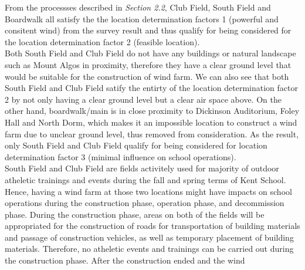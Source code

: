 \documentclass[review]{elsarticle}
\begin{document}
\label{graph:locationpick}

From the processses described in \textit{Section 2.2}, Club Field, South Field and Boardwalk all satisfy the the location determination factors 1 (powerful and consitent wind) 
from the survey result and thus qualify for being considered for the location determination factor 2 (feasible location).  %
\\\indent Both South Field and Club Field do not have any buildings or natural landscape such as Mount Algos in proximity, therefore they have a clear ground level that would 
be suitable for the construction of wind farm. We can also see that both South Field and Club Field satify the entirty of the location determination factor 2 by not only having 
a clear ground level but a clear air space above. On the other hand, boardwalk/main is in close proximity to Dickinson Auditorium, Foley Hall and North Dorm, which makes it an 
impossible location to construct a wind farm due to unclear ground level, thus removed from consideration. As the result, only South Field and Club Field qualify for being 
considered for location determination factor 3 (minimal influence on school operations).
\\\indent South Field and Club Field are fields activitely used for majority of outdoor atheletic trainings and events during the fall and spring terms of Kent School. Hence, 
having a wind farm at those two locations might have impacts on school operations during the construction phase, operation phase, and decommission phase. During the construction 
phase, areas on both of the fields will be appropriated for the construction of roads for transportation of building materials and passage of construction vehicles, as well as
temporary placement of building materials. Therefore, no atheletic events and trainings can be carried out during the construction phase. After the construction ended and the wind 
\end{document}
